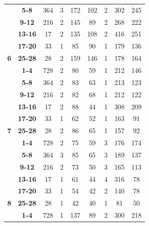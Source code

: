 \documentclass[sigconf,review]{acmart}
\begin{document}
\begin{table}
{\begin{tabular}{|c@{~}|c@{~}|c@{~}|c@{~}|c@{~}|c@{~}|c@{~}|c@{~}|c|}
 & \textbf{5-8} & 364 & 3 & 172 & 102 & \cellcolor[HTML]{EFEFEF}2 & 302 & 245 \\ \cline{2-9} 
 & \textbf{9-12} & 216 & \cellcolor[HTML]{EFEFEF}2 & 145 & 89 & \cellcolor[HTML]{EFEFEF}2 & 268 & 222 \\ \cline{2-9} 
 & \textbf{13-16} & 17 & \cellcolor[HTML]{EFEFEF}2 & 135 & 108 & \cellcolor[HTML]{EFEFEF}2 & 416 & 251 \\ \cline{2-9} 
 & \textbf{17-20} & 33 & \cellcolor[HTML]{C0C0C0}1 & 85 & 90 & \cellcolor[HTML]{C0C0C0}1 & 179 & 136 \\ \cline{2-9} 
\multirow{-6}{*}{\textbf{6}} & \textbf{25-28} & 28 & \cellcolor[HTML]{EFEFEF}2 & 159 & 146 & \cellcolor[HTML]{C0C0C0}1 & 178 & 164 \\ \hline
 & \textbf{1-4} & 728 & \cellcolor[HTML]{EFEFEF}2 & 80 & 59 & \cellcolor[HTML]{C0C0C0}1 & 212 & 146 \\ \cline{2-9} 
 & \textbf{5-8} & 364 & \cellcolor[HTML]{EFEFEF}2 & 83 & 63 & \cellcolor[HTML]{C0C0C0}1 & 213 & 123 \\ \cline{2-9} 
 & \textbf{9-12} & 216 & \cellcolor[HTML]{EFEFEF}2 & 82 & 68 & \cellcolor[HTML]{C0C0C0}1 & 212 & 122 \\ \cline{2-9} 
 & \textbf{13-16} & 17 & \cellcolor[HTML]{EFEFEF}2 & 88 & 44 & \cellcolor[HTML]{C0C0C0}1 & 308 & 209 \\ \cline{2-9} 
 & \textbf{17-20} & 33 & \cellcolor[HTML]{C0C0C0}1 & 62 & 52 & \cellcolor[HTML]{C0C0C0}1 & 163 & 91 \\ \cline{2-9} 
\multirow{-6}{*}{\textbf{7}} & \textbf{25-28} & 28 & \cellcolor[HTML]{EFEFEF}2 & 86 & 65 & \cellcolor[HTML]{C0C0C0}1 & 157 & 92 \\ \hline
 & \textbf{1-4} & 728 & \cellcolor[HTML]{EFEFEF}2 & 75 & 59 & 3 & 176 & 174 \\ \cline{2-9} 
 & \textbf{5-8} & 364 & 3 & 85 & 65 & 3 & 189 & 137 \\ \cline{2-9} 
 & \textbf{9-12} & 216 & \cellcolor[HTML]{EFEFEF}2 & 73 & 50 & 3 & 165 & 113 \\ \cline{2-9} 
 & \textbf{13-16} & 17 & \cellcolor[HTML]{C0C0C0}1 & 61 & 44 & 4 & 316 & 78 \\ \cline{2-9} 
 & \textbf{17-20} & 33 & \cellcolor[HTML]{C0C0C0}1 & 54 & 42 & \cellcolor[HTML]{EFEFEF}2 & 140 & 78 \\ \cline{2-9} 
\multirow{-6}{*}{\textbf{8}} & \textbf{25-28} & 28 & \cellcolor[HTML]{C0C0C0}1 & 42 & 40 & \cellcolor[HTML]{C0C0C0}1 & 81 & 50 \\ \hline
 & \textbf{1-4} & 728 & \cellcolor[HTML]{C0C0C0}1 & 137 & 89 & \cellcolor[HTML]{EFEFEF}2 & 300 & 218 \\ \cline{2-9} 

\end{tabular}}
\end{table}
\end{document}

